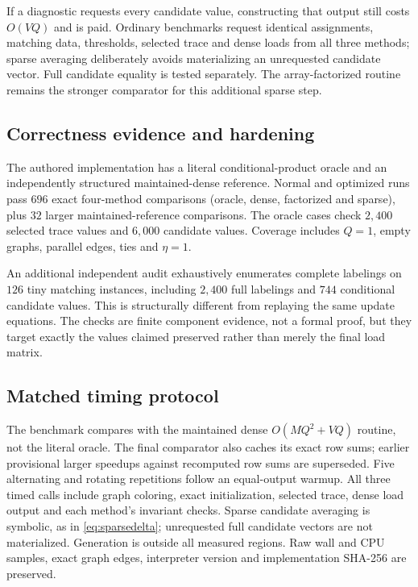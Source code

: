 \documentclass[11pt,letterpaper]{article}
\theoremstyle{remark}\newtheorem{remark}[theorem]{Remark}
\begin{document}
If a diagnostic requests every candidate value, constructing that output still costs $O(VQ)$ and is paid. Ordinary benchmarks request identical assignments, matching data, thresholds, selected trace and dense loads from all three methods; sparse averaging deliberately avoids materializing an unrequested candidate vector. Full candidate equality is tested separately. The array-factorized routine remains the stronger comparator for this additional sparse step.

\subsection{Correctness evidence and hardening}
The authored implementation has a literal conditional-product oracle and an independently structured maintained-dense reference. Normal and optimized runs pass $696$ exact four-method comparisons (oracle, dense, factorized and sparse), plus $32$ larger maintained-reference comparisons. The oracle cases check $2{,}400$ selected trace values and $6{,}000$ candidate values. Coverage includes $Q=1$, empty graphs, parallel edges, ties and $\eta=1$.

An additional independent audit exhaustively enumerates complete labelings on $126$ tiny matching instances, including $2{,}400$ full labelings and $744$ conditional candidate values. This is structurally different from replaying the same update equations. The checks are finite component evidence, not a formal proof, but they target exactly the values claimed preserved rather than merely the final load matrix.

\subsection{Matched timing protocol}
The benchmark compares with the maintained dense $O(MQ^2+VQ)$ routine, not the literal oracle. The final comparator also caches its exact row sums; earlier provisional larger speedups against recomputed row sums are superseded. Five alternating and rotating repetitions follow an equal-output warmup. All three timed calls include graph coloring, exact initialization, selected trace, dense load output and each method's invariant checks. Sparse candidate averaging is symbolic, as in \eqref{eq:sparsedelta}; unrequested full candidate vectors are not materialized. Generation is outside all measured regions. Raw wall and CPU samples, exact graph edges, interpreter version and implementation SHA-256 are preserved.
\end{document}
